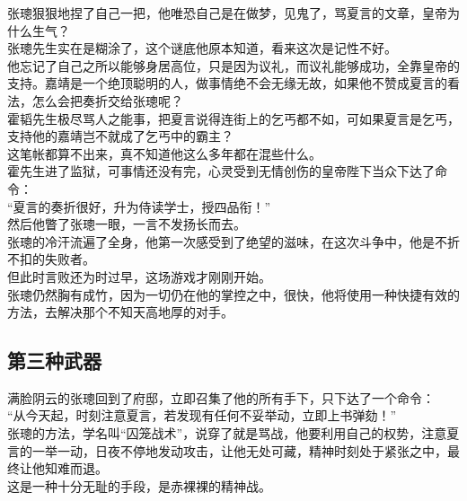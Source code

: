 \begin{multicols}{\theparacolNo}
张璁狠狠地捏了自己一把，他唯恐自己是在做梦，见鬼了，骂夏言的文章，皇帝为什么生气？\\

张璁先生实在是糊涂了，这个谜底他原本知道，看来这次是记性不好。\\

他忘记了自己之所以能够身居高位，只是因为议礼，而议礼能够成功，全靠皇帝的支持。嘉靖是一个绝顶聪明的人，做事情绝不会无缘无故，如果他不赞成夏言的看法，怎么会把奏折交给张璁呢？\\

霍韬先生极尽骂人之能事，把夏言说得连街上的乞丐都不如，可如果夏言是乞丐，支持他的嘉靖岂不就成了乞丐中的霸主？\\

这笔帐都算不出来，真不知道他这么多年都在混些什么。\\

霍先生进了监狱，可事情还没有完，心灵受到无情创伤的皇帝陛下当众下达了命令：\\

“夏言的奏折很好，升为侍读学士，授四品衔！”\\

然后他瞥了张璁一眼，一言不发扬长而去。\\

张璁的冷汗流遍了全身，他第一次感受到了绝望的滋味，在这次斗争中，他是不折不扣的失败者。\\

但此时言败还为时过早，这场游戏才刚刚开始。\\

张璁仍然胸有成竹，因为一切仍在他的掌控之中，很快，他将使用一种快捷有效的方法，去解决那个不知天高地厚的对手。\\

\subsection{第三种武器}
满脸阴云的张璁回到了府邸，立即召集了他的所有手下，只下达了一个命令：\\

“从今天起，时刻注意夏言，若发现有任何不妥举动，立即上书弹劾！”\\

张璁的方法，学名叫“囚笼战术”，说穿了就是骂战，他要利用自己的权势，注意夏言的一举一动，日夜不停地发动攻击，让他无处可藏，精神时刻处于紧张之中，最终让他知难而退。\\

这是一种十分无耻的手段，是赤裸裸的精神战。\\


\end{multicols}
